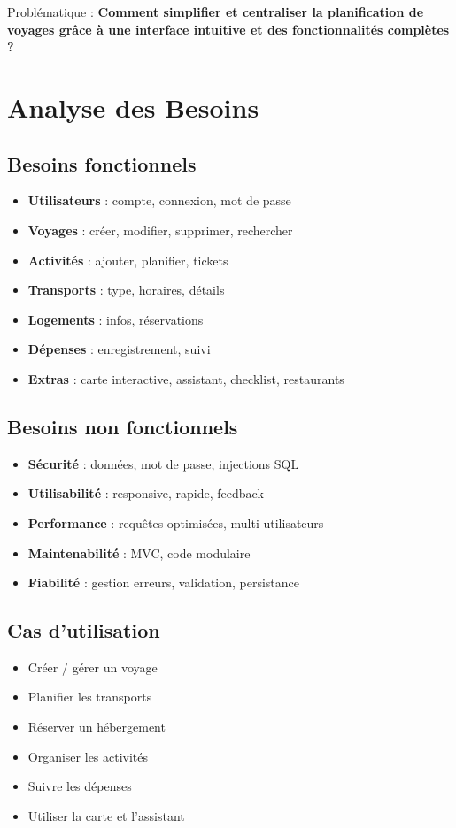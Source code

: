 \documentclass[a4paper,12pt]{article}
\begin{document}
Problématique : \textbf{Comment simplifier et centraliser la planification de voyages grâce à une interface intuitive et des fonctionnalités complètes ?}

\section{Analyse des Besoins}

\subsection{Besoins fonctionnels}
\begin{itemize}
    \item \textbf{Utilisateurs} : compte, connexion, mot de passe
    \item \textbf{Voyages} : créer, modifier, supprimer, rechercher
    \item \textbf{Activités} : ajouter, planifier, tickets
    \item \textbf{Transports} : type, horaires, détails
    \item \textbf{Logements} : infos, réservations
    \item \textbf{Dépenses} : enregistrement, suivi
    \item \textbf{Extras} : carte interactive, assistant, checklist, restaurants
\end{itemize}

\subsection{Besoins non fonctionnels}
\begin{itemize}
    \item \textbf{Sécurité} : données, mot de passe, injections SQL
    \item \textbf{Utilisabilité} : responsive, rapide, feedback
    \item \textbf{Performance} : requêtes optimisées, multi-utilisateurs
    \item \textbf{Maintenabilité} : MVC, code modulaire
    \item \textbf{Fiabilité} : gestion erreurs, validation, persistance
\end{itemize}

\subsection{Cas d'utilisation}
\begin{itemize}
    \item Créer / gérer un voyage
    \item Planifier les transports
    \item Réserver un hébergement
    \item Organiser les activités
    \item Suivre les dépenses
    \item Utiliser la carte et l’assistant
\end{itemize}
\end{document}
